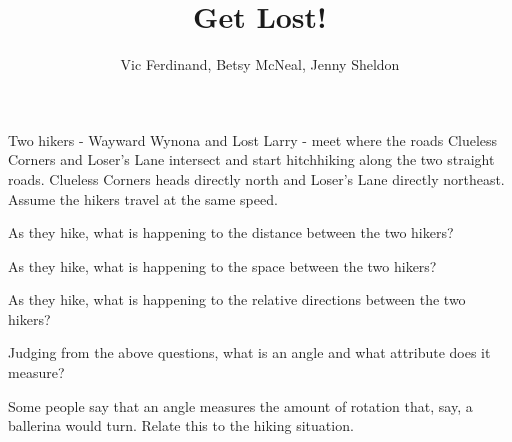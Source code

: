\documentclass[nooutcomes]{ximera}
\title{Get Lost!}
\author{Vic Ferdinand, Betsy McNeal, Jenny Sheldon}
\begin{document}
\begin{abstract}
\end{abstract}
\maketitle



Two hikers - Wayward Wynona and Lost Larry - meet where the roads Clueless Corners and Loser's Lane intersect and start hitchhiking along the two straight roads.  Clueless Corners heads directly north and Loser’s Lane directly northeast.  Assume the hikers travel at the same speed.

\begin{center}
\end{center}

\begin{problem} \label{GetLost1}
As they hike, what is happening to the distance between the two hikers?

\end{problem}

\begin{problem} \label{GetLost2}
As they hike, what is happening to the space between the two hikers?

\end{problem}

\begin{problem} \label{GetLost3}
As they hike, what is happening to the relative directions between the two hikers?

\end{problem}

\begin{problem} \label{GetLost4}
Judging from the above questions, what is an angle and what attribute does it measure?


\end{problem}


\begin{problem} \label{GetLost5}
Some people say that an angle measures the amount of rotation that, say, a ballerina would turn. Relate this to the hiking situation.

\end{problem}   
\end{document}
